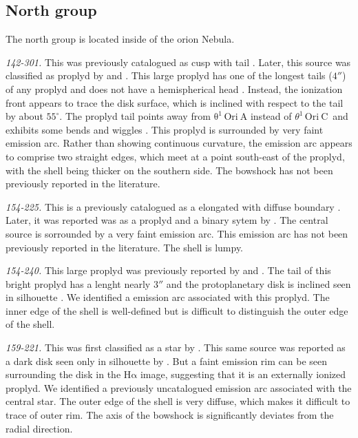 \documentclass[iop, apj]{emulateapj}
\newcommand\ha{\ensuremath{\mathrm{H\alpha}}}
\newcommand\thC{\ensuremath{\theta^1\,\mathrm{Ori~C}}}
\renewcommand\clearpage{}
\begin{document}
\clearpage
\subsection{North group}
\label{sec:n-group}



The north group is located inside of the orion Nebula.

\textit{142-301.} This was previously catalogued as cusp with tail
\citep{ODell:1996a}. Later, this source was classified as proplyd by
\citet{Bally:2000a} and \citet{Ricci:2008a}. This large proplyd has
one of the longest tails (\(4''\)) of any proplyd and does not have a
hemispherical head . Instead, the ionization front appears to trace
the disk surface, which is inclined with respect to the tail by about
$55^{\circ}$. The proplyd tail points away from
\(\mathrm{\theta^1\,Ori~A}\) instead of \thC~and exhibits some bends
and wiggles \citep{Bally:2000a}. This proplyd is surrounded by very
faint emission arc.  Rather than showing continuous curvature, the
emission arc appears to comprise two straight edges, which meet at a
point south-east of the proplyd, with the shell being thicker on the
southern side. The bowshock has not been previously reported in the literature. 

\textit{154-225.} This is a previously catalogued as a elongated with diffuse boundary \citep{ODell:1996a}. Later, it was reported was as a proplyd and a binary sytem by \citet{Ricci:2008a}. The central source is sorrounded by a very faint emission arc.  This  emission arc has not been previously reported in the literature. The shell is lumpy.

\textit{154-240.} This large proplyd was previously reported by \citet{Bally:2000a} and \citet{Ricci:2008a}. The tail of this bright proplyd has a lenght nearly \(3''\) and the protoplanetary disk is inclined seen in silhouette \citep{Bally:2000a}. We identified a emission arc associated with this proplyd. The inner edge of the shell is well-defined but is difficult to distinguish the outer edge of the shell.  

\textit{159-221.} This was first classified as a star by
\citet{ODell:1996a}. This same source was reported as a dark disk seen
only in silhouette by \citet{Ricci:2008a}. But a faint emission rim
can be seen surrounding the disk in the \ha{} image, suggesting that
it is an externally ionized proplyd. We identified a previously uncatalogued emission arc associated with the central star. The outer edge of the shell is very diffuse, which  makes it difficult to trace of outer rim. The axis of the bowshock is significantly deviates from the radial direction.
\end{document}
